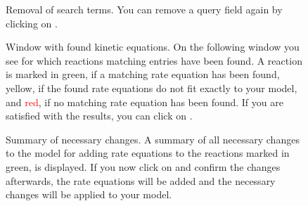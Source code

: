 \begin{figure}[htbp]
\caption{Removal of search terms.
You can remove a query field again by clicking on .}
\label{fig:removeSearchTerms}
\end{figure}

\begin{figure}[htbp]
\caption{Window with found kinetic equations.
On the following window you see for which reactions matching entries have been found.
A reaction is marked in green, if a matching rate equation has been found, yellow,
if the found rate equations do not fit exactly to your model, and \textcolor{red}{red}, if no matching
rate equation has been found. If you are satisfied with the results, you can click on .}
\label{fig:foundEquations}
\end{figure}


\begin{figure}[htbp]
\caption{Summary of necessary changes.
A summary of all necessary changes to the model for adding rate equations to the
reactions marked in green, is displayed.
If you now click on  and confirm the changes afterwards, the rate
equations will be added and the necessary changes will be applied to your model.}
\label{fig:changes}
\end{figure}




